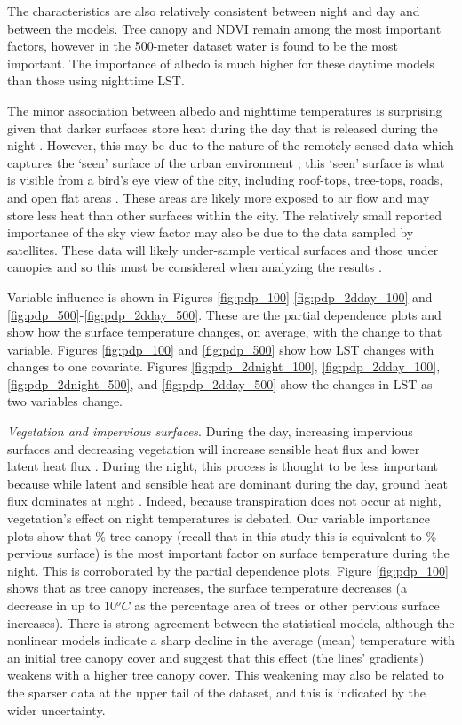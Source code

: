 \documentclass[final,3p,times,onecolumn,sort&compress]{elsarticle}
\begin{document}
The characteristics are also relatively consistent between night and day and between the models. 
Tree canopy and NDVI remain among the most important factors, however in the 500-meter dataset water is found to be the most important.
The importance of albedo is much higher for these daytime models than those using nighttime LST.

The minor association between albedo and nighttime temperatures is surprising given that darker surfaces store heat during the day that is released during the night \citep{Voogt2003-mm, Zhou2014-wc}.
However, this may be due to the nature of the remotely sensed data which captures the `seen' surface of the urban environment \citep{Roth1989-jj}; 
this `seen' surface is what is visible from a bird's eye view of the city, including roof-tops, tree-tops, roads, and open flat areas \citep{Roth1989-jj}.
These areas are likely more exposed to air flow and may store less heat than other surfaces within the city.
The relatively small reported importance of the sky view factor may also be due to the data sampled by satellites.
These data will likely under-sample vertical surfaces and those under canopies \citep{Roth1989-jj, Arnfield2003-gn} and so this must be considered when analyzing the results \citep{Roth1989-jj}.

Variable influence is shown in Figures \ref{fig:pdp_100}-\ref{fig:pdp_2dday_100} and \ref{fig:pdp_500}-\ref{fig:pdp_2dday_500}. 
These are the partial dependence plots and show how the surface temperature changes, on average, with the change to that variable.
Figures \ref{fig:pdp_100} and \ref{fig:pdp_500} show how LST changes with changes to one covariate.
Figures \ref{fig:pdp_2dnight_100}, \ref{fig:pdp_2dday_100}, \ref{fig:pdp_2dnight_500}, and \ref{fig:pdp_2dday_500} show the changes in LST as two variables change.

\textit{Vegetation and impervious surfaces}. 
During the day, increasing impervious surfaces and decreasing vegetation will increase sensible heat flux and lower latent heat flux \citep{Voogt2003-mm, Peng2012-iy, Zhou2014-wc}.
During the night, this process is thought to be less important because while latent and sensible heat are dominant during the day, ground heat flux dominates at night \citep{Zhou2014-wc, Voogt2003-mm}.
Indeed, because transpiration does not occur at night, vegetation's effect on night temperatures is debated. 
Our variable importance plots show that \% tree canopy (recall that in this study this is equivalent to \% pervious surface) is the most important factor on surface temperature during the night.
This is corroborated by the partial dependence plots.
Figure \ref{fig:pdp_100} shows that as tree canopy increases, the surface temperature decreases (a decrease in up to 10$^oC$ as the percentage area of trees or other pervious surface increases).
There is strong agreement between the statistical models, although the nonlinear models indicate a sharp decline in the average (mean) temperature with an initial tree canopy cover and suggest that this effect (the lines' gradients) weakens with a higher tree canopy cover.
This weakening may also be related to the sparser data at the upper tail of the dataset, and this is indicated by the wider uncertainty.
\end{document}
